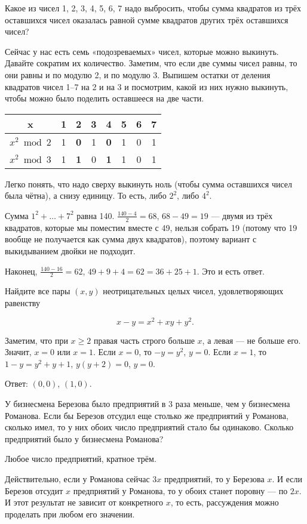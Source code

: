 
\begin{itemize}

\itA Какое из чисел 1, 2, 3, 4, 5, 6, 7 надо выбросить, чтобы сумма квадратов из трёх оставшихся чисел оказалась равной сумме квадратов других трёх оставшихся чисел?

\itr Сейчас у нас есть семь «подозреваемых» чисел, которые можно выкинуть. Давайте сократим их количество. Заметим, что если две суммы чисел равны, то они равны и по модулю 2, и по модулю 3. Выпишем остатки от деления квадратов чисел 1–7 на 2 и на 3 и посмотрим, какой из них нужно выкинуть, чтобы можно было поделить оставшееся на две части.

\begin{center} \begin{tabular}{|c|c|c|c|c|c|c|c|}
	\hline
	x & 1 & \bfseries 2 & 3 & \bfseries 4 & 5 & 6 & 7 \\ \hline
	$x^2 \bmod 2$ & 1 & \bfseries 0 & 1 & \bfseries 0 & 1 & 0 & 1\\ \hline
	$x^2 \bmod 3$ & 1 & \bfseries 1 & 0 & \bfseries 1 & 1 & 0 & 1\\ \hline
\end{tabular} \end{center}

Легко понять, что надо сверху выкинуть ноль (чтобы сумма оставшихся чисел была чётна), а снизу единицу. То есть, либо $2^2$, либо $4^2$.

Сумма $1^2 + \ldots + 7^2$ равна 140. $\tfrac{140-4}{2}=68$, $68-49=19$ — двумя из трёх квадратов, которые мы поместим вместе с 49, нельзя собрать 19 (потому что 19 вообще не получается как сумма двух квадратов), поэтому вариант с выкидыванием двойки не подходит.

Наконец, $\tfrac{140-16}{2} = 62$, $49+9+4=62=36+25+1$. Это и есть ответ.

\itC Найдите все пары $(x, y)$ неотрицательных целых чисел, удовлетворяющих равенству

$$x-y=x^2+xy+y^2.$$

\itr Заметим, что при $x \ge 2$ правая часть строго больше $x$, а левая — не больше его. Значит, $x=0$ или $x=1$. Если $x=0$, то $-y = y^2$, $y=0$. Если $x=1$, то $1-y=y^2+y+1$, $y(y+2)=0$, $y=0$.

Ответ: $(0,0)$, $(1,0)$.
\end{itemize}


\begin{itemize}
\itA У бизнесмена Березова было предприятий в 3 раза меньше, чем у бизнесмена Романова. Если бы Березов отсудил еще столько же предприятий у Романова, сколько имел, то у них обоих число предприятий стало бы одинаково. Сколько предприятий было у бизнесмена Романова?

\itr Любое число предприятий, кратное трём.

Действительно, если у Романова сейчас $3x$ предприятий, то у Березова $x$. И если Березов отсудит $x$ предприятий у Романова, то у обоих станет поровну — по $2x$. И этот результат не зависит от конкретного $x$, то есть, рассуждения можно проделать при любом его значении.
\end{itemize}